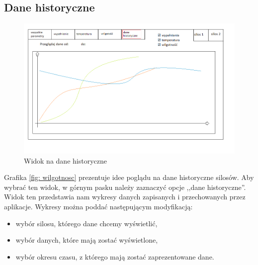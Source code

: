     \subsection{Dane historyczne}
        \begin{figure}[H]
            \centering
            \includegraphics[width = \textwidth]{obrazy/projekt_grafiki/wykresy.png}
            \caption{Widok na dane historyczne}
            \label{fig: dane historyczne}
        \end{figure}
        Grafika \ref{fig: wilgotnosc} prezentuje idee poglądu na dane historyczne silosów. Aby wybrać ten widok,
        w górnym pasku należy zaznaczyć opcje ,,dane historyczne''. Widok ten przedstawia nam wykresy danych zapisanych i przechowanych przez aplikacje.
        Wykresy można poddać następującym modyfikacją:
        \begin{itemize}
            \item wybór silosu, którego dane chcemy wyświetlić,
            \item wybór danych, które mają zostać wyświetlone,
            \item wybór okresu czasu, z którego mają zostać zaprezentowane  dane.
        \end{itemize}
        